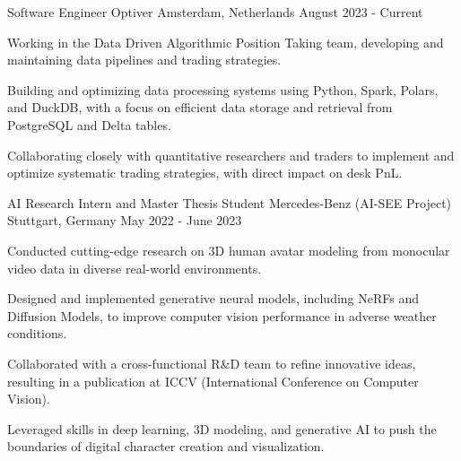 
\begin{cventries}

  \cventry
    {Software Engineer} %
    {Optiver} %
    {Amsterdam, Netherlands} %
    {August 2023 - Current} %
    {
      \begin{cvitems} %
        \item {Working in the Data Driven Algorithmic Position Taking team, developing and maintaining data pipelines and trading strategies.}
        \item {Building and optimizing data processing systems using Python, Spark, Polars, and DuckDB, with a focus on efficient data storage and retrieval from PostgreSQL and Delta tables.}
        \item {Collaborating closely with quantitative researchers and traders to implement and optimize systematic trading strategies, with direct impact on desk PnL.}
      \end{cvitems}
    }

  \cventry
    {AI Research Intern and Master Thesis Student} %
    {Mercedes-Benz (AI-SEE Project)} %
    {Stuttgart, Germany} %
    {May 2022 - June 2023} %
    {
      \begin{cvitems} %
        \item {Conducted cutting-edge research on 3D human avatar modeling from monocular video data in diverse real-world environments.}
        \item {Designed and implemented generative neural models, including NeRFs and Diffusion Models, to improve computer vision performance in adverse weather conditions.}
        \item {Collaborated with a cross-functional R\&D team to refine innovative ideas, resulting in a publication at ICCV (International Conference on Computer Vision).}
        \item {Leveraged skills in deep learning, 3D modeling, and generative AI to push the boundaries of digital character creation and visualization.}
      \end{cvitems}
    }

\end{cventries}

